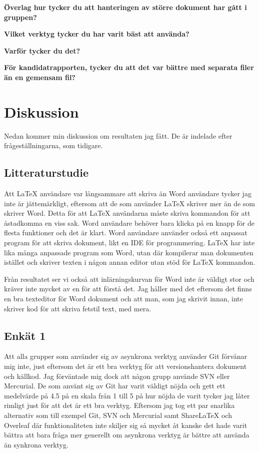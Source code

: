 \textbf{Överlag hur tycker du att hanteringen av större dokument har gått i gruppen?}

\textbf{Vilket verktyg tycker du har varit bäst att använda?}

\textbf{Varför tycker du det?}

\textbf{För kandidatrapporten, tycker du att det var bättre med separata filer än en gemensam fil?}

\section{Diskussion}
\label{sec:discussion-tuhkala}
Nedan kommer min diskussion om resultaten jag fått. De är indelade efter frågeställningarna, som tidigare.

\subsection{Litteraturstudie}
Att LaTeX användare var långsammare att skriva än Word användare tycker jag inte är jättemärkligt, eftersom att de som använder LaTeX skriver mer än de som skriver Word. Detta för att LaTeX användarna måste skriva kommandon för att åstadkomma en viss sak. Word användare behöver bara klicka på en knapp för de flesta funktioner och det är klart. Word användare använder också ett anpassat program för att skriva dokument, likt en IDE för programmering. LaTeX har inte lika många anpassade program som Word, utan där kompilerar man dokumenten istället och skriver texten i någon annan editor utan stöd för LaTeX kommandon.

Från resultatet ser vi också att inlärningskurvan för Word inte är väldigt stor och kräver inte mycket av en för att förstå det. Jag håller med det eftersom det finns en bra texteditor för Word dokument och att man, som jag skrivit innan, inte skriver kod för att skriva fetstil text, med mera. 

\subsection{Enkät 1}

Att alla grupper som använder sig av asynkrona verktyg använder Git förvånar mig inte, just eftersom det är ett bra verktyg för att versionshantera dokument och källkod. Jag förväntade mig dock att någon grupp använde SVN eller Mercurial. De som använt sig av Git har varit väldigt nöjda och gett ett medelvärde på 4.5 på en skala från 1 till 5 på hur nöjda de varit tycker jag låter rimligt just för att det är ett bra verktyg. Eftersom jag tog ett par snarlika alternativ som till exempel Git, SVN och Mercurial samt ShareLaTeX och Overleaf där funktionaliteten inte skiljer sig så mycket åt kanske det hade varit bättra att bara fråga mer generellt om asynkrona verktyg är bättre att använda än synkrona verktyg.

